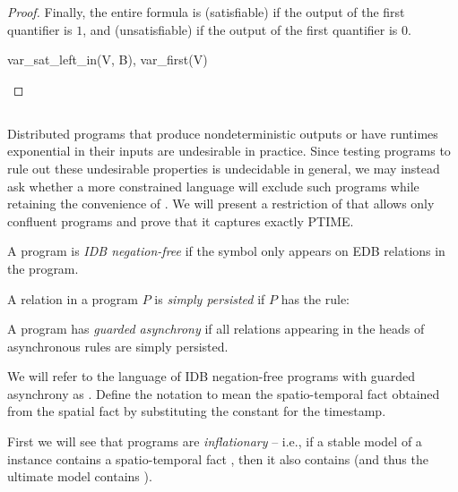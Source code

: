 \begin{proof}
Finally, the entire formula is  (satisfiable) if the output of the first quantifier is $1$, and  (unsatisfiable) if the output of the first quantifier is $0$.

\begin{Drules}
        {var_sat_left_in(V, B), var_first(V)}
\end{Drules}
\end{proof}

\subsection{\large \bf \slang}

Distributed programs that produce nondeterministic outputs or have runtimes
exponential in their inputs are undesirable in practice.  Since testing \lang
programs to rule out these undesirable properties is undecidable in general, we
may instead ask whether a more constrained language will exclude such programs
while retaining the convenience of \lang.  We will present a restriction of
\lang that allows only confluent programs and prove that it captures exactly
PTIME.

\begin{definition}
A \lang program is {\em IDB negation-free} if the \dedalus{!} symbol only appears on EDB relations in the program.
\end{definition}

\begin{definition}
A relation  in a \lang program $P$ is {\em simply persisted} if $P$ has the rule: 
\end{definition}

\begin{definition}
A \lang program has {\em guarded asynchrony} if all relations appearing in the heads of asynchronous rules are simply persisted.
\end{definition}

We will refer to the language of IDB negation-free \lang programs with guarded asynchrony as \slang.  Define the notation  to mean the spatio-temporal fact obtained from the spatial fact  by substituting the constant  for the timestamp. 

First we will see that \slang programs are {\em inflationary} -- i.e., if a stable model of a \slang instance contains a spatio-temporal fact , then it also contains  (and thus the ultimate model contains ).

